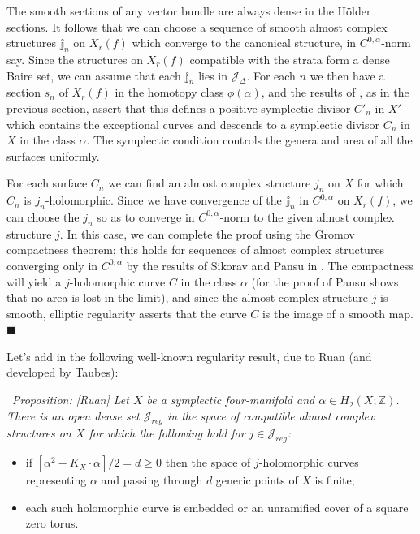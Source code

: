 \documentclass[10pt]{article}
\newcommand{\zz}{\mathbb{Z}}
\newcounter{Universal}[section]
\renewcommand{\theUniversal}{\thesection.\arabic{Universal}}
\newenvironment{Italic}{\refstepcounter{Universal} \par \vspace{0.5cm}
\noindent {\bf (\theUniversal)}\ \it}{\par \vspace{0.5cm}}
\newenvironment{Prop}{\begin{Italic}{\sc Proposition:} }{\end{Italic}}
\newenvironment{Pf}{\par \noindent{\sc Proof:} }{\quad $\blacksquare$ \par
\vspace{0.5cm}}
\begin{document}
\begin{Pf}
\vspace{0.2cm}

\noindent The smooth sections of any vector bundle are always dense in
the H\"older sections.  It follows that we can
choose a sequence of smooth almost complex structures
$\mathbb{j}_n$ on $X_r(f)$ which converge to the canonical structure,
in $C^{0,\alpha}$-norm say.  Since
the structures on $X_r(f)$ compatible with the strata form a dense
Baire set, we can assume that each $\mathbb{j}_n$ lies in
$\mathcal{J}_{\Delta}$.  For each $n$ we then have a section $s_n$ of
$X_r(f)$ in the homotopy class $\phi(\alpha)$, and the results of
\cite{SKDIS}, as in the previous section, assert that this defines a
positive symplectic divisor
$C'_n$ in $X'$ which contains the exceptional curves and descends to a
symplectic divisor $C_n$ in $X$ in the class $\alpha$.  The symplectic
condition controls the genera and area of all the surfaces uniformly.

\vspace{0.2cm}

\noindent For each surface $C_n$ we can find an almost complex
structure $j_n$ on $X$ for which $C_n$ is $j_n$-holomorphic.  Since we
have convergence of the $\mathbb{j}_n$ in
$C^{0,\alpha}$ on $X_r(f)$, we can choose the $j_n$ so as to converge
in $C^{0,\alpha}$-norm to the given 
almost complex structure $j$.  In this case, we can complete the proof
using the Gromov compactness theorem; this holds for sequences of
almost complex structures converging only in $C^{0,\alpha}$ by the
results of Sikorav and Pansu in \cite{AudLaf:eds}.  The
compactness will
yield a $j$-holomorphic curve $C$ in the class $\alpha$ (for the proof of
Pansu shows that no area is lost in the limit), and since the almost
complex structure $j$ is smooth, elliptic regularity asserts that the
curve $C$ is the image of a smooth map. 
\end{Pf}

\noindent  Let's add in the following well-known regularity result, due to
Ruan (and developed by Taubes):

\begin{Prop}[Ruan]
Let $X$ be a symplectic four-manifold and $\alpha \in H_2 (X;\zz)$.
There is an open dense set
$\mathcal{J}_{reg}$ in 
the space of compatible almost complex structures on $X$ for which the
following hold for $j \in \mathcal{J}_{reg}$:

\begin{itemize}
\item if $[\alpha^2 - K_X \cdot \alpha]/2 = d \geq 0$ then the space of
  $j$-holomorphic curves
  representing $\alpha$ and passing through $d$ generic points of $X$
  is finite; 
\item each such holomorphic curve is embedded or an unramified cover
  of a square zero torus.
\end{itemize}
\end{Prop}
\end{document}
